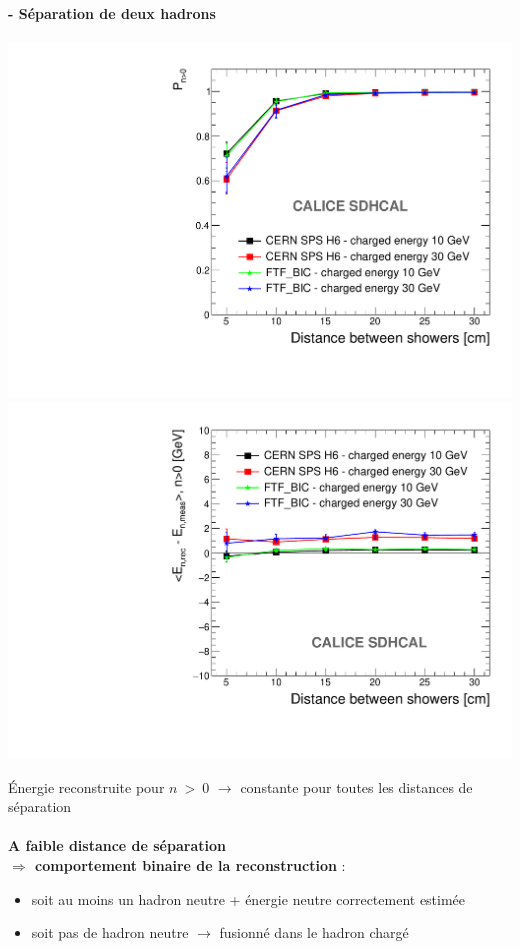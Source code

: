\documentclass[8pt]{beamer}
\begin{document}
  \begin{frame}
  \frametitle{\secname}
  \framesubtitle{\subsecname - Séparation de deux hadrons}
    \begin{center}
      \includegraphics[width=0.49\linewidth]{OverlayEvent_ProbaNeutral.pdf}
      \includegraphics[width=0.49\linewidth]{OverlayEvent_EnergyDifferenceEfficient.pdf}
    \end{center}
    Énergie reconstruite pour $n~>~0$ $\rightarrow$ constante pour toutes les distances de séparation \\
    ~ \\
    \textbf{A faible distance de séparation \\ $\Rightarrow$ comportement binaire de la reconstruction} :
    \begin{itemize}
      \item soit au moins un hadron neutre + énergie neutre correctement estimée
      \item soit pas de hadron neutre $\rightarrow$ fusionné dans le hadron chargé
    \end{itemize}
  \end{frame}
\end{document}
